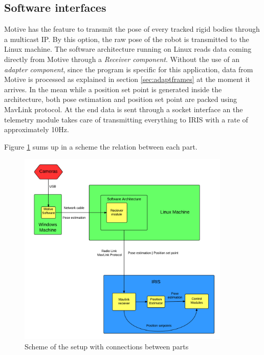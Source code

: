\subsection{Software interfaces}

Motive has the feature to transmit the pose of every tracked rigid bodies through a multicast IP. By this option, the raw pose of the robot is transmitted to the Linux machine. The software architecture running on Linux reads data coming directly from Motive through a \textit{Receiver component}. Without the use of an \textit{adapter component}, since the program is specific for this application, data from Motive is processed as explained in section \ref{sec:adaptframes} at the moment it arrives. In the mean while a position set point is generated inside the architecture, both pose estimation and position set point are packed using MavLink protocol. At the end data is sent through a socket interface an the telemetry module takes care of transmitting everything to IRIS with a rate of approximately 10Hz.

Figure \ref{figure:integration} sums up in a scheme the relation between each part. 

\begin{figure}[h]
\centering
 \includegraphics[width=0.9\textwidth]{integration.png}
 \caption[Setup scheme]{Scheme of the setup with connections between parts}
 \label{figure:integration}
\end{figure}

